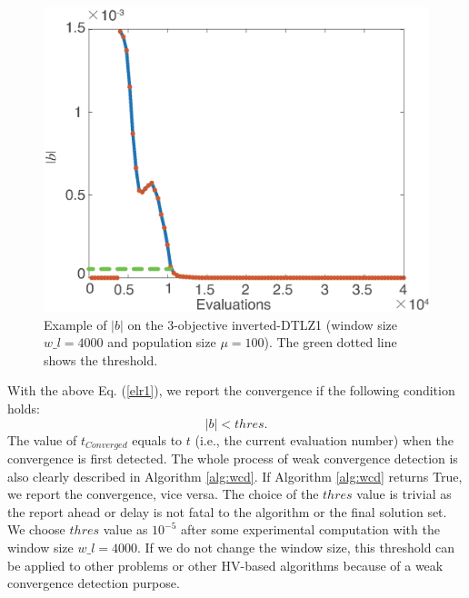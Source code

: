 \documentclass[conference]{IEEEtran}
\begin{document}
\begin{figure}[!t]
  \centering
    \includegraphics[width=\columnwidth]{FVEMOA_IDTLZ1_M3_nadir_2}
  \caption{Example of $\lvert b\rvert$ on the 3-objective inverted-DTLZ1
  (window size $w\_l = 4000$ and population size $\mu = 100$).
  The green dotted line shows the threshold.
  }
  \label{wcd2}
\end{figure}

With the above Eq. (\ref{elr1}), we report the convergence if the following
condition holds:
\begin{equation}\label{elr2}
  \lvert b \rvert < thres. 
\end{equation}
The value of $t_{Converged}$ equals to $t$ (i.e., the current evaluation number) 
when the convergence is first detected. 
The whole process of weak convergence detection is also clearly described in Algorithm \ref{alg:wcd}. 
If Algorithm \ref{alg:wcd} returns True, we report the convergence, vice versa. 
The choice of the $thres$ value is trivial 
as the report ahead or delay is not fatal to the algorithm or the final solution set.
We choose $thres$ value as $10^{-5}$ after some experimental computation with 
the window size $w\_ l = 4000$. 
If we do not change the window size, 
this threshold can be applied to other problems or other HV-based algorithms
because of a weak convergence detection purpose.
\end{document}
